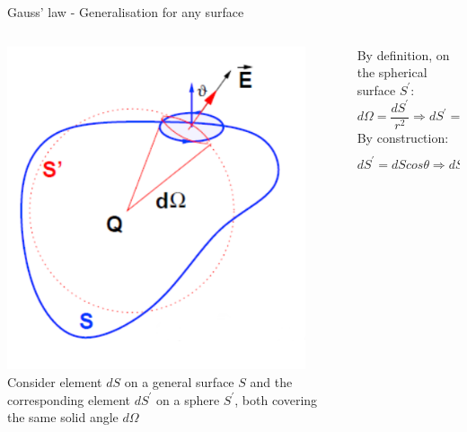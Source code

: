 %
%
%

\begin{frame}{Gauss' law - Generalisation for any surface}

\begin{columns}
  \begin{column}{0.34\textwidth}
   \begin{center}
    \includegraphics[width=0.90\textwidth]{./images/schematics/gauss_law_generalisation_geom_1.png}\\
    {\scriptsize
     Consider element $dS$ on a general surface $S$ and the corresponding element $dS^{\prime}$ on a sphere $S^{\prime}$,
     both covering the same solid angle $d\Omega$
    }
   \end{center}
  \end{column}
  \begin{column}{0.66\textwidth}
     By definition, on the spherical surface $S^{\prime}$:
     \begin{equation*}
       d\Omega = \frac{dS^{\prime}}{r^{2}} \Rightarrow dS^{\prime} = r^{2} d\Omega
     \end{equation*}
     By construction:
     \begin{equation*}
       dS^{\prime} = dS cos\theta \Rightarrow dS = \frac{dS^{\prime}}{cos\theta} \Rightarrow dS = \frac{r^{2} d\Omega}{cos\theta}
     \end{equation*}

\end{column}
\end{columns}
\end{frame}
